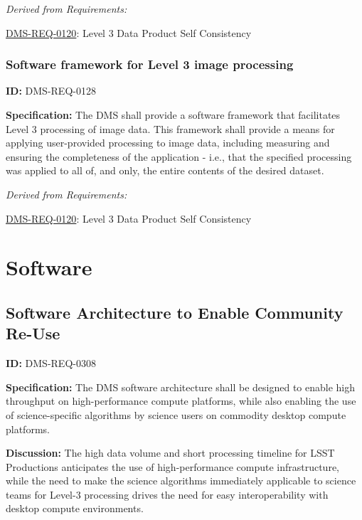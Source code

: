 \documentclass[SE,toc,lsstdraft]{lsstdoc}
\begin{document}
\emph{Derived from Requirements:}

\hyperref[DMS-REQ-0120]{DMS-REQ-0120}:
Level 3 Data Product Self Consistency \newline


\subsubsection{Software framework for Level 3 image processing}

\label{DMS-REQ-0128}
\textbf{ID:} DMS-REQ-0128

\textbf{Specification:} The DMS shall provide a software framework that facilitates Level 3 processing of image data.  This framework shall provide a means for applying user-provided processing to image data, including measuring and ensuring the completeness of the application - i.e., that the specified processing was applied to all of, and only, the entire contents of the desired dataset.






\emph{Derived from Requirements:}

\hyperref[DMS-REQ-0120]{DMS-REQ-0120}:
Level 3 Data Product Self Consistency \newline


\section{Software}





\subsection{Software Architecture to Enable Community Re-Use}

\label{DMS-REQ-0308}
\textbf{ID:} DMS-REQ-0308

\textbf{Specification:} The DMS software architecture shall be designed to enable high throughput on high-performance compute platforms, while also enabling the use of science-specific algorithms by science users on commodity desktop compute platforms.

\textbf{Discussion: }The high data volume and short processing timeline for LSST Productions anticipates the use of high-performance compute infrastructure, while the need to make the science algorithms immediately applicable to science teams for Level-3 processing drives the need for easy interoperability with desktop compute environments.
\end{document}
